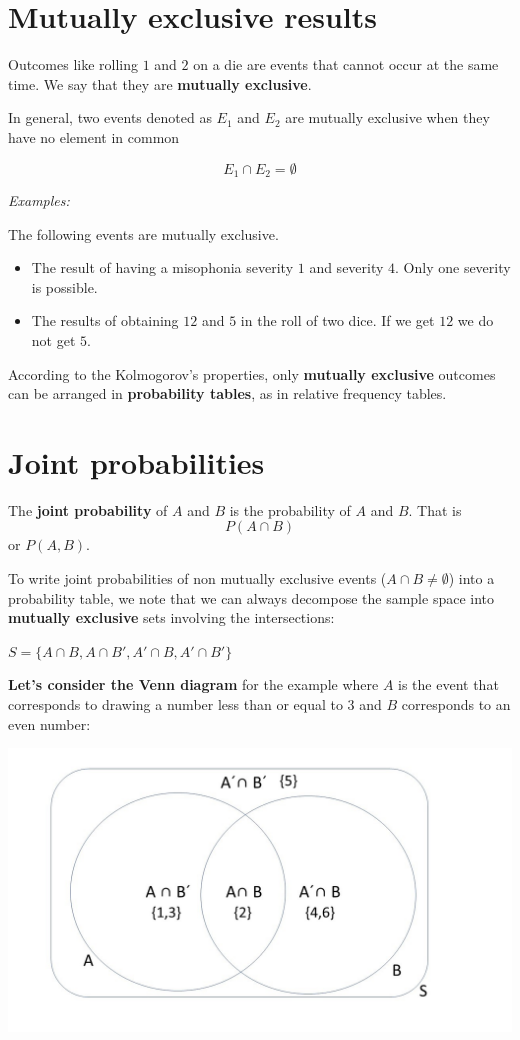 \documentclass[
]{book}
\begin{document}
\hypertarget{mutually-exclusive-results}{%
\section{Mutually exclusive results}\label{mutually-exclusive-results}}

Outcomes like rolling \(1\) and \(2\) on a die are events that cannot occur at the same time. We say that they are \textbf{mutually exclusive}.

In general, two events denoted as \(E_1\) and \(E_2\) are mutually exclusive when they have no element in common

\[E_1\cap E_2=\emptyset\]

\emph{Examples:}

The following events are mutually exclusive.

\begin{itemize}
\item
  The result of having a misophonia severity \(1\) and severity \(4\). Only one severity is possible.
\item
  The results of obtaining \(12\) and \(5\) in the roll of two dice. If we get \(12\) we do not get \(5\).
\end{itemize}

According to the Kolmogorov's properties, only \textbf{mutually exclusive} outcomes can be arranged in \textbf{probability tables}, as in relative frequency tables.

\hypertarget{joint-probabilities}{%
\section{Joint probabilities}\label{joint-probabilities}}

The \textbf{joint probability} of \(A\) and \(B\) is the probability of \(A\) and \(B\). That is \[P( A \cap B)\] or \(P(A,B)\).

To write joint probabilities of non mutually exclusive events (\(A \cap B \neq \emptyset\)) into a probability table, we note that we can always decompose the sample space into \textbf{mutually exclusive} sets involving the intersections:

\(S=\{A\cap B, A \cap B', A'\cap B, A'\cap B'\}\)

\textbf{Let's consider the Venn diagram} for the example where \(A\) is the event that corresponds to drawing a number less than or equal to 3 and \(B\) corresponds to an even number:

\includegraphics{./figures/Venn.JPG}
\end{document}
